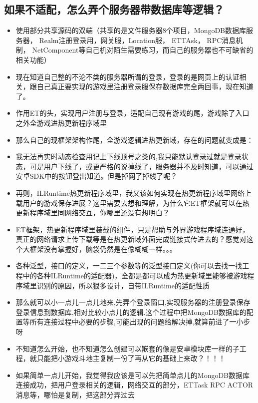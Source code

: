 \documentclass[9pt, b5paper]{article}
\begin{document}
\subsection{如果不适配，怎么弄个服务器带数据库等逻辑？}
\label{sec-2-2}
\begin{itemize}
\item 使用部分共享源码的双端（共享的是文件服务器8个项目，MongoDB数据库服务器， Realm注册登录用，网关服，Location服， ETTAsk， RPC消息机制， NetComponent等自己机对陌生需要练习，而自己的服务器也不可缺省的相关功能）
\item 现在知道自己整的不沦不类的服务器所谓的登录，登录的是网页上的认证相关，跟自己真正要实现的游戏里注册登录服保存数据库完全两回事，现在知道了。
\item 作用ET的头，实现用户注册与登录，适配自己现有游戏的尾，游戏除了入口之外全游戏进热更新程序域里
\item 那么自己的现框架架构作尾，全游戏逻辑进热更新域，存在的问题就变成是：
\item 我无法再实时动态检查用记上下线顶号之类的,我只能默认登录过就是登录状态，可是用户下线了，或更严格的说掉线了，服务器并不及时知道，可以通过安卓SDK中的按钮登出知道。但是掉网了掉线了呢？
\item 再则，ILRuntime热更新程序域里，我又该如何实现在热更新程序域里网络上载用户的游戏保存进展？这里需要去想和理解，为什么它ET框架就可以在热更新程序域里同网络交互，你哪里还没有想明白？
\item ET框架，热更新程序域里装载的组件，只是帮助与外界游戏程序域连通好，真正的网络请求上传下载等是在热更新域外面完成链接式传进去的？感觉对这个大框架没有掌握好，脑袋仍然是在像糊糊一样。。。
\item 各种泛型，接口的定义，一二三个参数等的泛型接口定义(你可以去找一找工程中的各种ILRuntime的适配器)，全都是都可以成为热更新域里能够被游戏程序域里识别的原因，所以狠多设计，自带ILRuntime的适配性质
\item 那么就可以小一点儿一点儿地来,先弄个登录窗口,实现服务器的注册登录保存登录信息到数据库,相对比较小点儿的逻辑.这个过程中把MongoDB数据库的配置等所有连接过程中必要的步骤,可能出现的问题给解决掉,就算前进了一小步呀
\item 不知道怎么开始，也不知道怎么创建可以㠌套的像是安卓模块库一样的子工程，就只能把小游戏斗地主复制一份了再从它的基础上来改？！！！
\item 如果简单一点儿开始，我觉得我应该是可以先把简单点儿的MongoDB数据库连接成功，把用户登录相关的逻辑，网络交互的部分，ETTask RPC ACTOR消息等，哪怕是复制，把这部分弄过去
\end{itemize}
\end{document}
